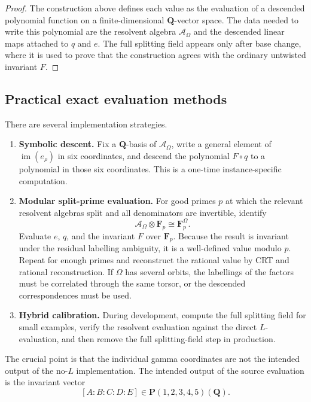 \documentclass[11pt]{article}
\newcommand{\QQ}{\mathbf{Q}}
\newcommand{\PP}{\mathbf{P}}
\newcommand{\im}{\operatorname{im}}
\newcommand{\cA}{\mathcal{A}}
\begin{document}
\begin{proof}
The construction above defines each value as the evaluation of a descended
polynomial function on a finite-dimensional $\QQ$-vector space.  The data needed to
write this polynomial are the resolvent algebra $\cA_\Omega$ and the descended
linear maps attached to $q$ and $e$.  The full splitting field appears only after
base change, where it is used to prove that the construction agrees with the
ordinary untwisted invariant $F$.
\end{proof}

\subsection{Practical exact evaluation methods}

There are several implementation strategies.

\begin{enumerate}[label=\textbf{Method \arabic*.}]
\item \textbf{Symbolic descent.}  Fix a $\QQ$-basis of $\cA_\Omega$, write a
general element of $\im(e_\rho)$ in six coordinates, and descend the polynomial
$F\circ q$ to a polynomial in those six coordinates.  This is a one-time
instance-specific computation.

\item \textbf{Modular split-prime evaluation.}  For good primes $p$ at which the
relevant resolvent algebras split and all denominators are invertible, identify
\[
  \cA_\Omega\otimes\mathbf F_p\cong \mathbf F_p^\Omega.
\]
Evaluate $e$, $q$, and the invariant $F$ over $\mathbf F_p$.  Because the result is
invariant under the residual labelling ambiguity, it is a well-defined value modulo
$p$.  Repeat for enough primes and reconstruct the rational value by CRT and
rational reconstruction.  If $\Omega$ has several orbits, the labellings of the
factors must be correlated through the same torsor, or the descended
correspondences must be used.

\item \textbf{Hybrid calibration.}  During development, compute the full splitting
field for small examples, verify the resolvent evaluation against the direct
$L$-evaluation, and then remove the full splitting-field step in production.
\end{enumerate}

The crucial point is that the individual gamma coordinates are not the intended
output of the no-$L$ implementation.  The intended output of the source evaluation
is the invariant vector
\[
  [A:B:C:D:E]\in\PP(1,2,3,4,5)(\QQ).
\]
\end{document}
